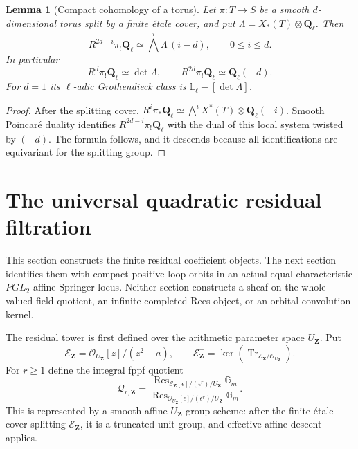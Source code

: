 \documentclass[11pt]{article}
\newtheorem{lemma}[theorem]{Lemma}
\theoremstyle{definition}
\theoremstyle{remark}
\newcommand{\Qell}{\mathbf Q_\ell}
\newcommand{\Lell}{\mathbb L_{\ell}}
\newcommand{\UZ}{U_{\mathbf Z}}
\begin{document}
\begin{lemma}[Compact cohomology of a torus]
\label{lem:torus-compact-cohomology}
Let $\pi:T\to S$ be a smooth $d$-dimensional torus split by a finite \'etale
cover, and put $\Lambda=X_*(T)\otimes\Qell$.  Then
\begin{equation}
 R^{2d-i}\pi_!\Qell
 \simeq \bigwedge^i\Lambda\,(i-d),
 \qquad 0\le i\le d.
 \label{eq:torus-compact-cohomology}
\end{equation}
In particular
\[
 R^d\pi_!\Qell\simeq\det\Lambda,
 \qquad
 R^{2d}\pi_!\Qell\simeq\Qell(-d).
\]
For $d=1$ its $\ell$-adic Grothendieck class is
$\Lell-[\det\Lambda]$.
\end{lemma}

\begin{proof}
After the splitting cover,
$R^i\pi_*\Qell\simeq\bigwedge^iX^*(T)\otimes\Qell(-i)$.
Smooth Poincar\'e duality identifies $R^{2d-i}\pi_!\Qell$ with the dual of
this local system twisted by $(-d)$.  The formula follows, and it descends
because all identifications are equivariant for the splitting group.
\end{proof}


\section{The universal quadratic residual filtration}
\label{sec:residual-filtration}

This section constructs the finite residual coefficient objects.  The next
section identifies them with compact positive-loop orbits in an actual
equal-characteristic $PGL_2$ affine-Springer locus.  Neither section constructs
a sheaf on the whole valued-field quotient, an infinite completed Rees object,
or an orbital convolution kernel.

The residual tower is first defined over the arithmetic parameter space
$\UZ$.  Put
\[
 \mathcal E_{\mathbf Z}=\mathcal O_{\UZ}[z]/(z^2-a),
 \qquad
 \mathcal E_{\mathbf Z}^-
 =\ker(\operatorname{Tr}_{\mathcal E_{\mathbf Z}/\mathcal O_{\UZ}}).
\]
For $r\geq1$ define the integral fppf quotient
\begin{equation}
 \mathscr Q_{r,\mathbf Z}=
 \frac{\operatorname{Res}_{\mathcal E_{\mathbf Z}[\epsilon]/(\epsilon^r)/\UZ}\mathbb G_m}
      {\operatorname{Res}_{\mathcal O_{\UZ}[\epsilon]/(\epsilon^r)/\UZ}\mathbb G_m}.
 \label{eq:Haar-residual-quotient}
\end{equation}
This is represented by a smooth affine $\UZ$-group scheme: after the finite
\'etale cover splitting $\mathcal E_{\mathbf Z}$, it is a truncated unit
group, and effective affine descent applies.
\end{document}
